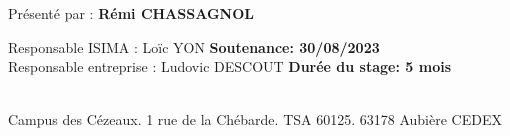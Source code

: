 \begin{titlepage}
\begin{center}
    \large
    Présenté par : \textbf{Rémi CHASSAGNOL}

    \vfill

    \vspace{0.5cm}
  \end{center}


  \large
  \noindent
  Responsable ISIMA : Loïc YON \hfill \textbf{Soutenance: 30/08/2023}\\
  Responsable entreprise : Ludovic DESCOUT \hfill \textbf{Durée du stage: 5 mois}\\~\\
  \raggedright
  \begin{center}
  Campus des Cézeaux. 1 rue de la Chébarde. TSA 60125. 63178 Aubière CEDEX\\
  \end{center}
\end{titlepage}
